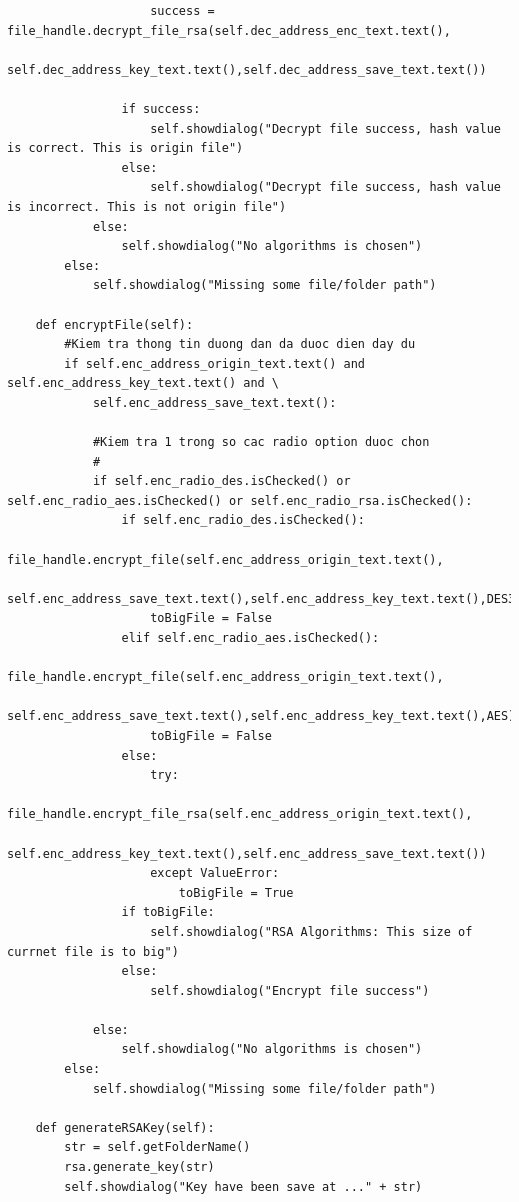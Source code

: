 \documentclass[a4paper]{article}
\begin{document}
\begin{itemize}
\begin{lstlisting}
                    success = file_handle.decrypt_file_rsa(self.dec_address_enc_text.text(),
                    self.dec_address_key_text.text(),self.dec_address_save_text.text())
                
                if success:
                    self.showdialog("Decrypt file success, hash value is correct. This is origin file")
                else:
                    self.showdialog("Decrypt file success, hash value is incorrect. This is not origin file")
            else:
                self.showdialog("No algorithms is chosen")
        else:
            self.showdialog("Missing some file/folder path")

    def encryptFile(self):
        #Kiem tra thong tin duong dan da duoc dien day du
        if self.enc_address_origin_text.text() and self.enc_address_key_text.text() and \
            self.enc_address_save_text.text():

            #Kiem tra 1 trong so cac radio option duoc chon
            #
            if self.enc_radio_des.isChecked() or self.enc_radio_aes.isChecked() or self.enc_radio_rsa.isChecked():
                if self.enc_radio_des.isChecked():
                    file_handle.encrypt_file(self.enc_address_origin_text.text(),
                    self.enc_address_save_text.text(),self.enc_address_key_text.text(),DES3)
                    toBigFile = False
                elif self.enc_radio_aes.isChecked():
                    file_handle.encrypt_file(self.enc_address_origin_text.text(),
                    self.enc_address_save_text.text(),self.enc_address_key_text.text(),AES)
                    toBigFile = False
                else:
                    try:
                        file_handle.encrypt_file_rsa(self.enc_address_origin_text.text(),
                        self.enc_address_key_text.text(),self.enc_address_save_text.text())
                    except ValueError:
                        toBigFile = True
                if toBigFile:
                    self.showdialog("RSA Algorithms: This size of currnet file is to big")
                else:
                    self.showdialog("Encrypt file success")

            else:
                self.showdialog("No algorithms is chosen")
        else:
            self.showdialog("Missing some file/folder path")

    def generateRSAKey(self):
        str = self.getFolderName()
        rsa.generate_key(str)
        self.showdialog("Key have been save at ..." + str)


\end{lstlisting}
\end{itemize}
\end{document}
